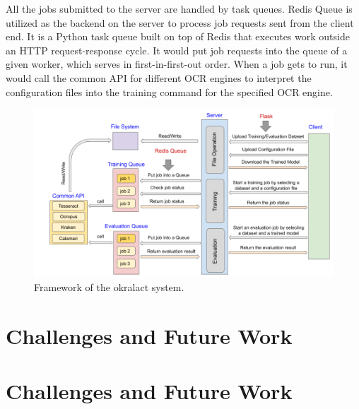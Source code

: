 \documentclass[conference]{IEEEtran}
\begin{document}
All the jobs submitted to the server are handled by task queues. Redis Queue is utilized as the backend on the server to process job requests sent from the client end. It is a Python task queue built on top of Redis that executes work outside an HTTP request-response cycle. It would put job requests into the queue of a given worker, which serves in first-in-first-out order. When a job gets to run, it would call the common API for different OCR engines to interpret the configuration files into the training command for the specified OCR engine. 

\begin{figure}[ht!]
        \begin{center}
     \includegraphics[width=0.8\linewidth]{Figures/Framework.png}
        \end{center}
        \caption{\small{Framework of the okralact system.}}
\label{fig:framework}
\end{figure}

\section*{Challenges and Future Work}


\section*{Challenges and Future Work}


\end{document}
